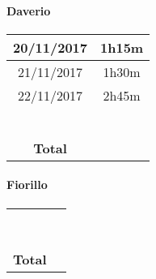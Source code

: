 

\paragraph*{Daverio}

\begin{tabular}{|c|c|}
	\hline 
20/11/2017	& 1h15m \\ 
	\hline 
21/11/2017	& 1h30m \\ 
	\hline 
22/11/2017	& 2h45m \\ 
	\hline 
	&  \\ 
	\hline 
	&  \\ 
	\hline 
	&  \\ 
	\hline 
	&  \\ 
	\hline 
	&  \\ 
	\hline 
	&  \\ 
	\hline 
\textbf{Total}	&  \\ 
	\hline 
\end{tabular} 

\paragraph*{Fiorillo}

\begin{tabular}{|c|c|}
	\hline 
		&  \\ 
	\hline 
		&  \\ 
	\hline 
		&  \\ 
	\hline 
	&  \\ 
	\hline 
	&  \\ 
	\hline 
	&  \\ 
	\hline 
	&  \\ 
	\hline 
	&  \\ 
	\hline 
	&  \\ 
	\hline 
\textbf{Total}	&  \\ 
	\hline 
\end{tabular} 